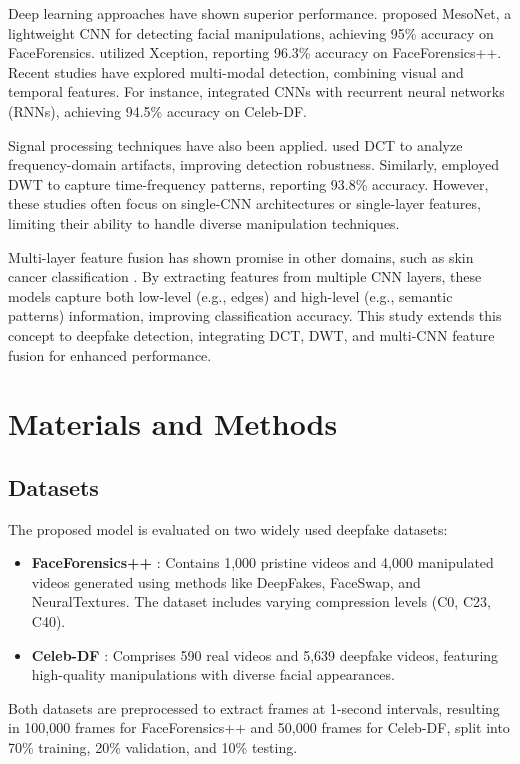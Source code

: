 \documentclass[12pt]{article}
\begin{document}
Deep learning approaches have shown superior performance. \citet{afchar2018mesonet} proposed MesoNet, a lightweight CNN for detecting facial manipulations, achieving 95\% accuracy on FaceForensics. \citet{rossler2019faceforensics} utilized Xception, reporting 96.3\% accuracy on FaceForensics++. Recent studies have explored multi-modal detection, combining visual and temporal features. For instance, \citet{zhou2021deepfake} integrated CNNs with recurrent neural networks (RNNs), achieving 94.5\% accuracy on Celeb-DF.

Signal processing techniques have also been applied. \citet{frank2020leveraging} used DCT to analyze frequency-domain artifacts, improving detection robustness. Similarly, \citet{li2020frequency} employed DWT to capture time-frequency patterns, reporting 93.8\% accuracy. However, these studies often focus on single-CNN architectures or single-layer features, limiting their ability to handle diverse manipulation techniques.

Multi-layer feature fusion has shown promise in other domains, such as skin cancer classification \citep{attallah2024hybrid}. By extracting features from multiple CNN layers, these models capture both low-level (e.g., edges) and high-level (e.g., semantic patterns) information, improving classification accuracy. This study extends this concept to deepfake detection, integrating DCT, DWT, and multi-CNN feature fusion for enhanced performance.

\section{Materials and Methods}
\subsection{Datasets}
The proposed model is evaluated on two widely used deepfake datasets:
\begin{itemize}
    \item \textbf{FaceForensics++} \citep{rossler2019faceforensics}: Contains 1,000 pristine videos and 4,000 manipulated videos generated using methods like DeepFakes, FaceSwap, and NeuralTextures. The dataset includes varying compression levels (C0, C23, C40).
    \item \textbf{Celeb-DF} \citep{li2020celeb}: Comprises 590 real videos and 5,639 deepfake videos, featuring high-quality manipulations with diverse facial appearances.
\end{itemize}
Both datasets are preprocessed to extract frames at 1-second intervals, resulting in 100,000 frames for FaceForensics++ and 50,000 frames for Celeb-DF, split into 70\% training, 20\% validation, and 10\% testing.
\end{document}
